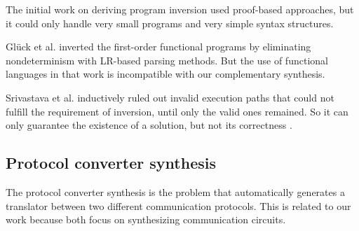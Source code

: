 \documentclass[journal]{IEEEtran}
\begin{document}
The initial work on deriving program inversion used proof-based approaches\cite{prog_inv},
but it could only handle very small programs and very simple syntax structures.

Gl\"{u}ck et al. \cite{mtd_autoProginv} inverted the first-order functional programs
by eliminating nondeterminism with LR-based parsing methods.
But the use of functional languages in that work is incompatible with our complementary synthesis.

Srivastava et al. \cite{prog_inv_rev}
inductively ruled out invalid execution paths that could not fulfill the requirement of inversion,
until only the valid ones remained.
So it can only guarantee the existence of a solution,
but not its correctness
.

%





\subsection{Protocol converter synthesis}
The protocol converter synthesis is the problem that automatically generates a translator between two different communication protocols.
This is related to our work because both focus on synthesizing communication circuits.
\end{document}
